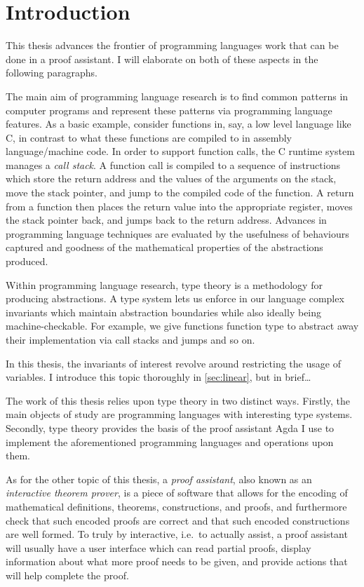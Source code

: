 \chapter{Introduction}

This thesis advances the frontier of programming languages work that can be done
in a proof assistant.
I will elaborate on both of these aspects in the following paragraphs.

The main aim of programming language research is to find common patterns in
computer programs and represent these patterns via programming language
features.
As a basic example, consider functions in, say, a low level language like C, in
contrast to what these functions are compiled to in assembly language/machine
code.
In order to support function calls, the C runtime system manages a
\emph{call stack}.
A function call is compiled to a sequence of instructions which store the return
address and the values of the arguments on the stack, move the stack pointer,
and jump to the compiled code of the function.
A return from a function then places the return value into the appropriate
register, moves the stack pointer back, and jumps back to the return address.
Advances in programming language techniques are evaluated by the usefulness of
behaviours captured and goodness of the mathematical properties of the
abstractions produced.

Within programming language research, type theory is a methodology for producing
abstractions.
A type system lets us enforce in our language complex invariants which maintain
abstraction boundaries while also ideally being machine-checkable.
For example, we give functions function type to abstract away their
implementation via call stacks and jumps and so on.

In this thesis, the invariants of interest revolve around restricting the usage
of variables.
I introduce this topic thoroughly in \cref{sec:linear}, but in brief\ldots

The work of this thesis relies upon type theory in two distinct ways.
Firstly, the main objects of study are programming languages with interesting
type systems.
Secondly, type theory provides the basis of the proof assistant Agda I use to
implement the aforementioned programming languages and operations upon them.

As for the other topic of this thesis,
a \emph{proof assistant}, also known as an \emph{interactive theorem prover}, is
a piece of software that allows for the encoding of mathematical definitions,
theorems, constructions, and proofs, and furthermore check that such encoded
proofs are correct and that such encoded constructions are well formed.
To truly by interactive, i.e.\ to actually assist, a proof assistant will
usually have a user interface which can read partial proofs, display
information about what more proof needs to be given, and provide actions that
will help complete the proof.


